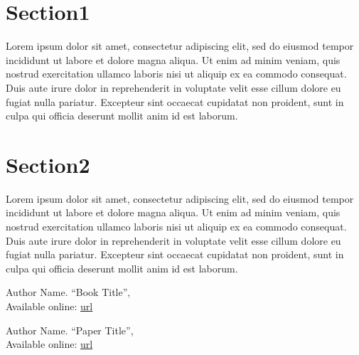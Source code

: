 \documentclass[12pt]{article}
\begin{document}
\newpage

\tableofcontents
\listoffigures

\newpage

\section{Section1}
    Lorem ipsum dolor sit amet, consectetur adipiscing elit, sed do eiusmod tempor incididunt ut labore et dolore magna aliqua. Ut enim ad minim veniam, quis nostrud exercitation ullamco laboris nisi ut aliquip ex ea commodo consequat. Duis aute irure dolor in reprehenderit in voluptate velit esse cillum dolore eu fugiat nulla pariatur. Excepteur sint occaecat cupidatat non proident, sunt in culpa qui officia deserunt mollit anim id est laborum.
\section{Section2}
    Lorem ipsum dolor sit amet, consectetur adipiscing elit, sed do eiusmod tempor incididunt ut labore et dolore magna aliqua. Ut enim ad minim veniam, quis nostrud exercitation ullamco laboris nisi ut aliquip ex ea commodo consequat. Duis aute irure dolor in reprehenderit in voluptate velit esse cillum dolore eu fugiat nulla pariatur. Excepteur sint occaecat cupidatat non proident, sunt in culpa qui officia deserunt mollit anim id est laborum.
    
\newpage

\begin{thebibliography}{9}
	Author Name. ``Book Title'', \\
	Available online: \url{url}
 
	Author Name. ``Paper Title'', \\
	Available online: \url{url}
\end{thebibliography}
\end{document}
